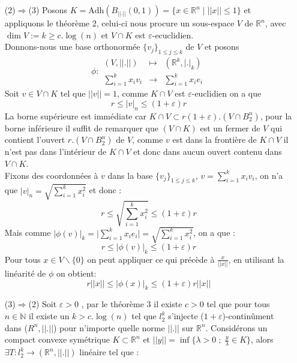 \documentclass[12pt]{article}
\begin{document}
\begin{enumerate}
	\item[(2)$\Rightarrow$(3)]
	Posons $K=\text{Adh}(B_{||.||}(0,1))=\{x\in\mathbb{R}^n \; | \; ||x||\leq 1 \}$ et appliquons le théorème 2, celui-ci nous procure un sous-espace $V$ de $\mathbb{R}^n$, avec $\dim V := k \geq c.\log(n)$ et $V\cap K$ est $\varepsilon\text{-ecuclidien}$.\\
	Donnons-nous une base orthonormée $\{v_j\}_{1\leq j \leq k}$ de $V$ et posons 
	\begin{equation*}
	\phi :\begin{array}{ccc}
	(V,||.||) & \mapsto &(\mathbb{R}^k,|.|_k) \\
	\sum_{i=1}^{k}x_i v_i & \to & \sum_{i=1}^{k}x_i e_i
	\end{array}
	\end{equation*}
	Soit $v\in V\cap K$ tel que $||v||=1$, comme $K\cap V$ est $\varepsilon$-euclidien on a que 
	\begin{equation*}
	r \leq |v|_n \leq (1+\varepsilon)r
	\end{equation*}
	La borne supérieure est immédiate car  $K\cap V \subset r(1+\varepsilon).(V\cap B^n_2)$, pour la borne inférieure il suffit de remarquer que $(V\cap K)$ est un fermer de $V$ qui contient l'ouvert $r.(V\cap B^n_2)$ de $V$, comme $v$ est dans la frontière de $K\cap V$ il n'est pas dans l'intérieur de $K\cap V$ et donc dans aucun ouvert contenu dans $V\cap K$.\\
	Fixons des coordonnées à $v$ dans la base $\{v_j\}_{1\leq j \leq k}$, $v = \sum_{i=1}^{k}x_iv_i$, on n'a que $|v|_n = \sqrt{\sum_{i=1}^{k}x_i^2}$ et donc :
	\begin{equation*}
	r \leq \sqrt{\sum_{i=1}^{k}x_i^2} \leq (1+\varepsilon)r
	\end{equation*}
	Mais comme $|\phi(v)|_k = \big|\sum_{i=1}^{k}x_i e_i \big| = \sqrt{\sum_{i=1}^{k}x_i^2}$, on a que :
	\begin{equation*}
	r \leq |\phi(v)|_k \leq (1+\varepsilon)r
	\end{equation*}
	Pour tous $x\in  V\backslash\{0\}$ on peut appliquer ce qui précède à $\frac{x}{||x||}$, en utilisant la linéarité de $\phi$ on obtient:
	\begin{equation*}
	r||x||\leq |\phi(x)|_k \leq (1+\varepsilon)r ||x||
	\end{equation*}
	\item[(3)$\Rightarrow$(2)]
	Soit $\varepsilon>0$ , par le théorème 3 il existe $c>0$ tel que pour tous $n\in\mathbb{N}$ il existe un $k>c.\log(n)$ tel que $l_2^k$ s'injecte ($1+\varepsilon$)-continûment dans ($R^n,||.||$) pour n’importe quelle norme $||.||$ sur $\mathbb{R}^n$. Considérons un compact convexe symétrique $K\subset \mathbb{R}^n$ et $||y||=\inf\Big\{\lambda>0\; ;\; \frac{y}{\lambda}\in K\Big\}$, alors $\exists T :l^{k}_2\to(\mathbb{R}^n,||.||)$ linéaire tel que :

\end{enumerate}
\end{document}

